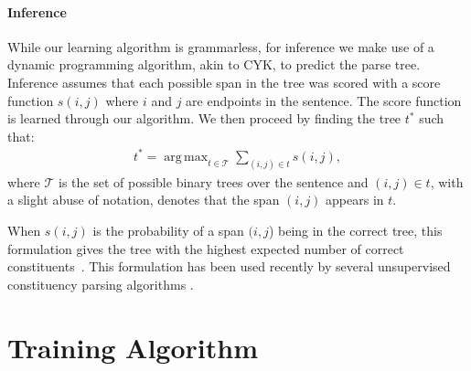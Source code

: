 \documentclass[11pt]{article}
\DeclareMathOperator*{\argmax}{arg\,max}
\begin{document}
\paragraph{Inference}
While our learning algorithm is grammarless, for inference we make use of a dynamic programming algorithm, akin to CYK, to predict the parse tree. Inference assumes that each possible span in the tree was scored with a score function $s(i,j)$ where $i$ and $j$ are endpoints in the sentence. The score function is learned through our algorithm. We then proceed by finding the tree $t^{\ast}$ such that:
\begin{align*}
t^{\ast} = \argmax_{t \in \mathcal{T}} \sum_{(i,j) \in t} s(i,j),
\end{align*}
\noindent where $\mathcal{T}$ is the set of possible binary trees over the sentence and $(i,j) \in t$, with a slight abuse of notation, denotes that the span $(i,j)$ appears in $t$.

When $s(i,j)$ is the probability of a span $(i,j$) being in the correct tree, this formulation gives the tree with the highest expected number of correct constituents~\citep{goodman-1996-parsing}. This formulation has been used recently by several unsupervised constituency parsing algorithms \citep{kim-etal-2019-unsupervised, kim-etal-2019-compound, cao-etal-2020-unsupervised, li-etal-2020-heads}.
 \section{Training Algorithm}
\label{sec:training}
\end{document}
